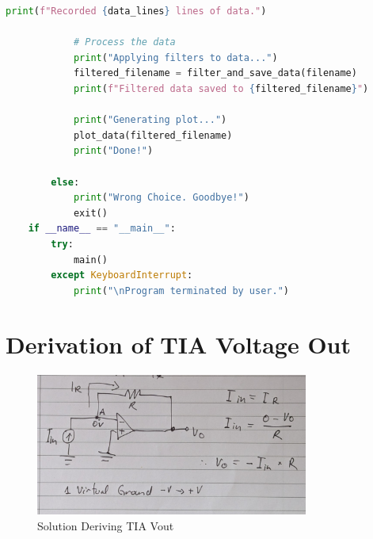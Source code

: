 \begin{lstlisting}[style=pythonstyle, caption=Python Serial Receive Script, label=lst:pythonCodeApp, language=Python ]
            print(f"Recorded {data_lines} lines of data.")
            
            # Process the data
            print("Applying filters to data...")
            filtered_filename = filter_and_save_data(filename)
            print(f"Filtered data saved to {filtered_filename}")
            
            print("Generating plot...")
            plot_data(filtered_filename)
            print("Done!")
            
        else:
            print("Wrong Choice. Goodbye!")
            exit()
    if __name__ == "__main__":
        try:
            main()
        except KeyboardInterrupt:
            print("\nProgram terminated by user.")
\end{lstlisting}

\section{Derivation of TIA Voltage Out}

%
\begin{figure}[htbp] 
    \centering
    \includegraphics[width=0.8\textwidth]{figures/Appendix-DAQ/Vo_deriv.png}
    \caption{Solution Deriving TIA Vout}
    \label{fig:Vo_deriv}
  \end{figure}